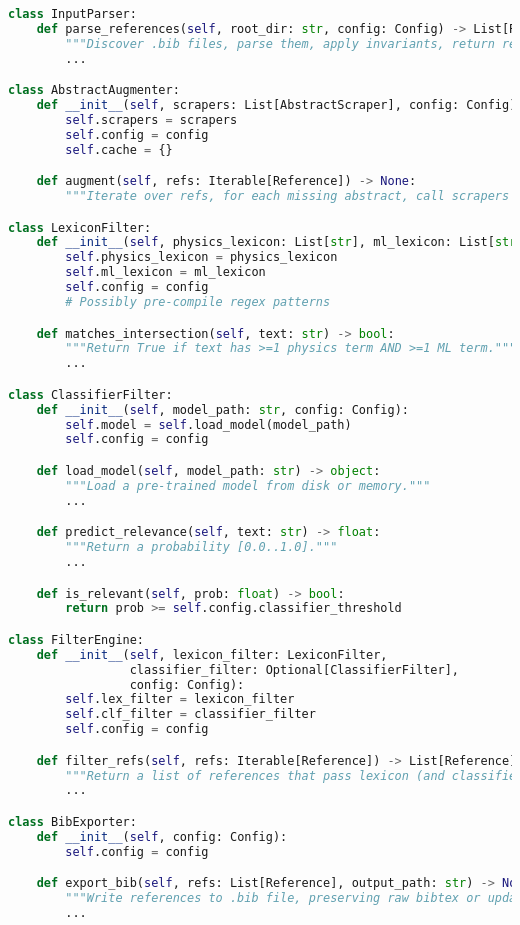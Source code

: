 \documentclass[12pt]{article}
\begin{document}
\begin{lstlisting}[language=Python]
class InputParser:
    def parse_references(self, root_dir: str, config: Config) -> List[Reference]:
        """Discover .bib files, parse them, apply invariants, return references."""
        ...

class AbstractAugmenter:
    def __init__(self, scrapers: List[AbstractScraper], config: Config):
        self.scrapers = scrapers
        self.config = config
        self.cache = {}

    def augment(self, refs: Iterable[Reference]) -> None:
        """Iterate over refs, for each missing abstract, call scrapers in sequence, update abstract."""

class LexiconFilter:
    def __init__(self, physics_lexicon: List[str], ml_lexicon: List[str], config: Config):
        self.physics_lexicon = physics_lexicon
        self.ml_lexicon = ml_lexicon
        self.config = config
        # Possibly pre-compile regex patterns

    def matches_intersection(self, text: str) -> bool:
        """Return True if text has >=1 physics term AND >=1 ML term."""
        ...

class ClassifierFilter:
    def __init__(self, model_path: str, config: Config):
        self.model = self.load_model(model_path)
        self.config = config

    def load_model(self, model_path: str) -> object:
        """Load a pre-trained model from disk or memory."""
        ...

    def predict_relevance(self, text: str) -> float:
        """Return a probability [0.0..1.0]."""
        ...

    def is_relevant(self, prob: float) -> bool:
        return prob >= self.config.classifier_threshold

class FilterEngine:
    def __init__(self, lexicon_filter: LexiconFilter,
                 classifier_filter: Optional[ClassifierFilter],
                 config: Config):
        self.lex_filter = lexicon_filter
        self.clf_filter = classifier_filter
        self.config = config

    def filter_refs(self, refs: Iterable[Reference]) -> List[Reference]:
        """Return a list of references that pass lexicon (and classifier if enabled)."""
        ...

class BibExporter:
    def __init__(self, config: Config):
        self.config = config

    def export_bib(self, refs: List[Reference], output_path: str) -> None:
        """Write references to .bib file, preserving raw bibtex or updating fields as needed."""
        ...
\end{lstlisting}
\end{document}
